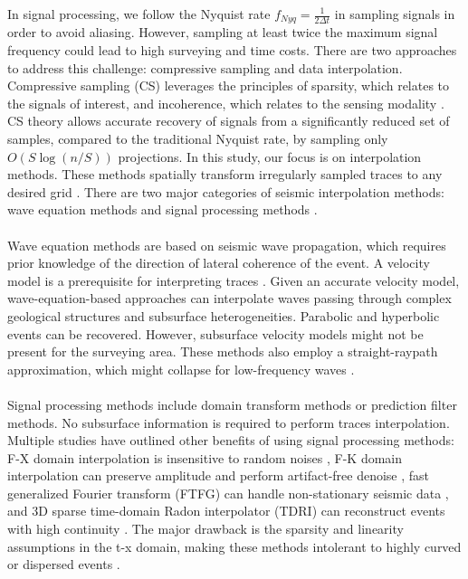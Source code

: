 In signal processing, we follow the Nyquist rate $f_{Nyq}=\frac{1}{2\Delta t}$ in sampling signals in order to avoid aliasing. However, sampling at least twice the maximum signal frequency could lead to high surveying and time costs. There are two approaches to address this challenge: compressive sampling and data interpolation. Compressive sampling (CS) leverages the principles of sparsity, which relates to the signals of interest, and incoherence, which relates to the sensing modality \cite{candes2008introduction}. CS theory allows accurate recovery of signals from a significantly reduced set of samples, compared to the traditional Nyquist rate, by sampling only $O(S\log{(n/S)})$ projections. \cite{candes2008introduction} In this study, our focus is on interpolation methods. These methods spatially transform irregularly sampled traces to any desired grid \cite{kaur2021seismic}. There are two major categories of seismic interpolation methods: wave equation methods and signal processing methods \cite{naghizadeh2011seismic,kaur2019seismic,kaur2021seismic}.
\\\\
Wave equation methods are based on seismic wave propagation, which requires prior knowledge of the direction of lateral coherence of the event. A velocity model is a prerequisite for interpreting traces \cite{ronen1987wave}. Given an accurate velocity model, wave-equation-based approaches can interpolate waves passing through complex geological structures and subsurface heterogeneities. Parabolic and hyperbolic events can be recovered. However, subsurface velocity models might not be present for the surveying area. These methods also employ a straight-raypath approximation, which might collapse for low-frequency waves \cite{stolt2002seismic}.
\\\\
Signal processing methods include domain transform methods or prediction filter methods. No subsurface information is required to perform traces interpolation. Multiple studies have outlined other benefits of using signal processing methods: F-X domain interpolation is insensitive to random noises \cite{spitz1991seismic}, F-K domain interpolation can preserve amplitude and perform artifact-free denoise \cite{naghizadeh2011seismic}, fast generalized Fourier transform (FTFG) can handle non-stationary seismic data \cite{naghizadeh2012seismic}, and 3D sparse time-domain Radon interpolator (TDRI) can reconstruct events with high continuity \cite{schonewille2014comparison}. The major drawback is the sparsity and linearity assumptions in the t-x domain, making these methods intolerant to highly curved or dispersed events \cite{spitz1991seismic, naghizadeh2011seismic, naghizadeh2012seismic}.

